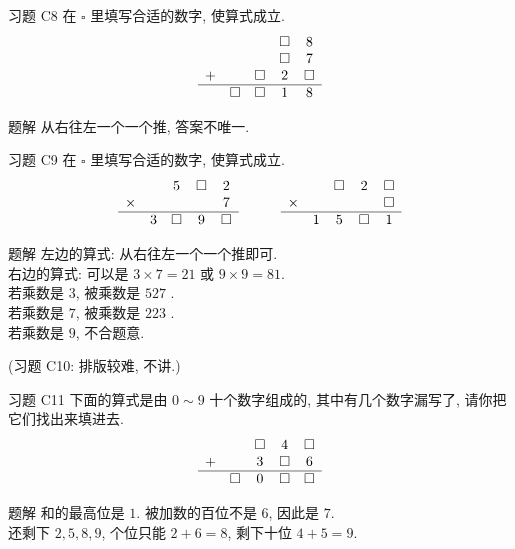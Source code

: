 \documentclass[content.tex]{subfiles}
\begin{document}
\begin{frame}{习题 C8}
在 $\square$ 里填写合适的数字, 使算式成立.
$$
\begin{matrix}
  &         &         & \square &       8 \\
  &         &         & \square &       7 \\
+ &         & \square &       2 & \square \\
\hline
  & \square & \square &       1 &       8 \\
\end{matrix}
$$
\begin{exampleblock}{题解}
从右往左一个一个推, 答案不唯一.
\end{exampleblock}
\end{frame}

\begin{frame}{习题 C9}
在 $\square$ 里填写合适的数字, 使算式成立.
$$
\begin{matrix}
  &         &       5 & \square &       2 \\
\times &    &         &         &       7 \\
\hline
  &       3 & \square &       9 & \square \\
\end{matrix}
\qquad\qquad
\begin{matrix}
  &         & \square &       2 & \square \\
\times &    &         &         & \square \\
\hline
  &       1 &       5 & \square &       1 \\
\end{matrix}
$$
\begin{exampleblock}{题解}
左边的算式: 从右往左一个一个推即可. \\
右边的算式: 可以是 $3\times 7=21$ 或 $9\times 9=81$. \\
若乘数是 $3$, 被乘数是 $527$ . \\
若乘数是 $7$, 被乘数是 $223$ . \\
若乘数是 $9$, 不合题意. \\
\end{exampleblock}
\centering (习题 C10: 排版较难, 不讲.) \\
\end{frame}

\begin{frame}{习题 C11}
下面的算式是由 $0 \sim 9$ 十个数字组成的, 其中有几个数字漏写了, 请你把它们找出来填进去.
$$
\begin{matrix}
  &         & \square &       4 & \square \\
+ &         &       3 & \square &       6 \\
\hline
  & \square &       0 & \square & \square \\
\end{matrix}
$$
\begin{exampleblock}{题解}
和的最高位是 $1$. 被加数的百位不是 $6$, 因此是 $7$. \\
还剩下 $2,5,8,9$, 个位只能 $2+6=8$, 剩下十位 $4+5=9$.
\end{exampleblock}
\end{frame}
\end{document}
